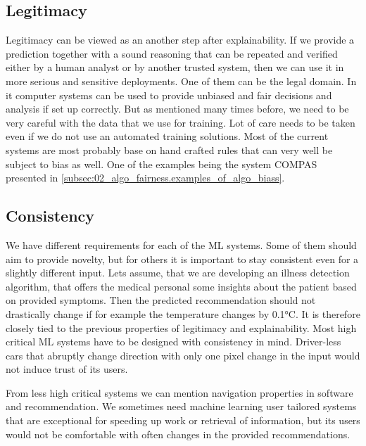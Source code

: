 \subsection{Legitimacy}
Legitimacy can be viewed as an another step after explainability. If we provide a prediction together with a sound reasoning that can be repeated and verified either by a human analyst or by another trusted system, then we can use it in more serious and sensitive deployments. One of them can be the legal domain. In it computer systems can be used to provide unbiased and fair decisions and analysis if set up correctly. But as mentioned many times before, we need to be very careful with the data that we use for training. Lot of care needs to be taken even if we do not use an automated training solutions. Most of the current systems are most probably base on hand crafted rules that can very well be subject to bias as well. One of the examples being the system COMPAS presented in \ref{subsec:02_algo_fairness.examples_of_algo_biass}.


\subsection{Consistency}
We have different requirements for each of the ML systems. Some of them should aim to provide novelty, but for others it is important to stay consistent even for a slightly different input. Lets assume, that we are developing an illness detection algorithm, that offers the medical personal some insights about the patient based on provided symptoms. Then the predicted recommendation should not drastically change if for example the temperature changes by 0.1°C. It is therefore closely tied to the previous properties of legitimacy and explainability. Most high critical ML systems have to be designed with consistency in mind. Driver-less cars that abruptly change direction with only one pixel change in the input would not induce trust of its users.

From less high critical systems we can mention navigation properties in software and recommendation. We sometimes need machine learning user tailored systems that are exceptional for speeding up work or retrieval of information, but its users would not be comfortable with often changes in the provided recommendations. 

